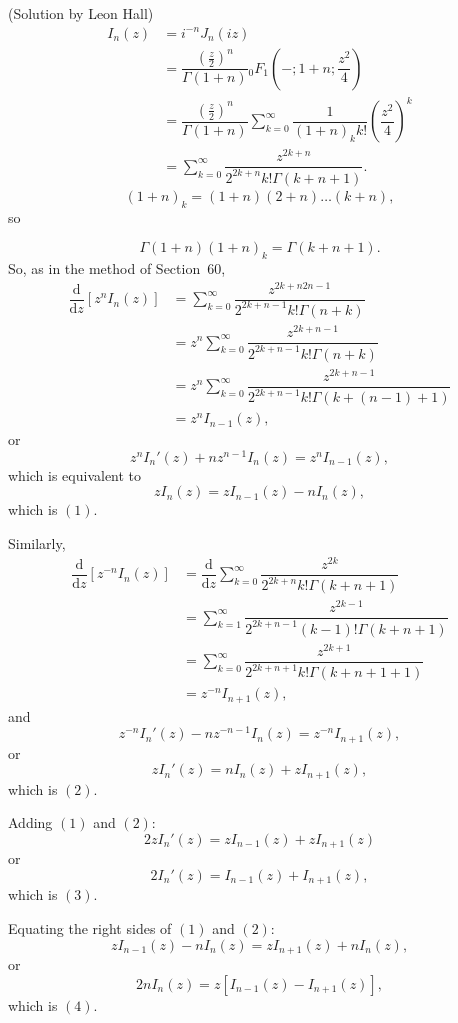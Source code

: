 \begin{solution}(Solution by Leon Hall)
$$\begin{array}{ll}
I_n(z) &= i^{-n}J_n(iz) \\
&= \dfrac{\left( \frac{z}{2} \right)^n}{\Gamma(1+n)} {}_0F_1 \left( -; 1+n; \dfrac{z^2}{4} \right) \\
&= \dfrac{\left( \frac{z}{2} \right)^n}{\Gamma(1+n)} \displaystyle\sum_{k=0}^{\infty} \dfrac{1}{(1+n)_k k!} \left( \dfrac{z^2}{4} \right)^k \\
&= \displaystyle\sum_{k=0}^{\infty} \dfrac{z^{2k+n}}{2^{2k+n}k! \Gamma(k+n+1)}.
\end{array}$$
$$(1+n)_k = (1+n)(2+n) \ldots (k+n),$$
so

$$\Gamma(1+n) (1+n)_k = \Gamma(k+n+1).$$
So, as in the method of Section~60,
$$\begin{array}{ll}
\dfrac{\mathrm{d}}{\mathrm{d}z} \left[ z^n I_n(z) \right] &= \displaystyle\sum_{k=0}^{\infty} \dfrac{z^{2k+n2n-1}}{2^{2k+n-1}k! \Gamma(n+k)} \\
&= z^n \displaystyle\sum_{k=0}^{\infty} \dfrac{z^{2k+n-1}}{2^{2k+n-1}k! \Gamma(n+k)} \\
&= z^n \displaystyle\sum_{k=0}^{\infty} \dfrac{z^{2k+n-1}}{2^{2k+n-1}k! \Gamma(k + (n-1)+1)} \\
&= z^n I_{n-1}(z),
\end{array}$$
or
$$z^nI_n'(z) + nz^{n-1}I_n(z) = z^n I_{n-1}(z),$$
which is equivalent to
$$zI_n(z) = zI_{n-1}(z) - nI_n(z),$$
which is $(1)$.

Similarly, 
$$\begin{array}{ll}
\dfrac{\mathrm{d}}{\mathrm{d}z} \left[ z^{-n} I_n(z) \right] &= \dfrac{\mathrm{d}}{\mathrm{d}z} \displaystyle\sum_{k=0}^{\infty} \dfrac{z^{2k}}{2^{2k+n} k! \Gamma(k+n+1)} \\
&= \displaystyle\sum_{k=1}^{\infty} \dfrac{z^{2k-1}}{2^{2k+n-1} (k-1)! \Gamma(k+n+1)} \\
&= \displaystyle\sum_{k=0}^{\infty} \dfrac{z^{2k+1}}{2^{2k+n+1} k! \Gamma(k+n+1+1)} \\
&= z^{-n} I_{n+1}(z),
\end{array}$$
and
$$z^{-n} I_n'(z) - nz^{-n-1} I_n(z) = z^{-n} I_{n+1}(z),$$
or
$$zI_n'(z) = nI_n(z) + z I_{n+1}(z),$$
which is $(2)$.

Adding $(1)$ and $(2)$:
$$2z I_n'(z) = z I_{n-1}(z) + zI_{n+1}(z)$$
or
$$2I_n'(z) = I_{n-1}(z) + I_{n+1}(z),$$
which is $(3)$.

Equating the right sides of $(1)$ and $(2)$:
$$zI_{n-1}(z) - nI_n(z) = zI_{n+1}(z) + nI_n(z),$$
or
$$2nI_n(z) = z[I_{n-1}(z) - I_{n+1}(z)],$$
which is $(4)$.
\end{solution}
